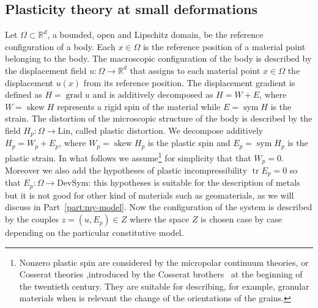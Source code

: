 \documentclass[a4paper,10pt,oneside]{amsbook}
\numberwithin{section}{chapter}
\numberwithin{equation}{chapter}
\theoremstyle{definition}
\DeclareMathOperator{\tr}{tr}
\DeclareMathOperator{\sym}{sym}
\DeclareMathOperator{\ske}{skew}
\DeclareMathOperator{\grad}{grad}
\begin{document}
\subsection{Plasticity theory at small deformations}

Let $\Omega\subset\mathbb{R}^d$, a bounded, open and Lipschitz domain, be the reference configuration of a body. Each $x\in\Omega$ is the reference position of a material point belonging to the body. The macroscopic configuration of the body is described by the displacement field $u\colon\Omega\to\mathbb{R}^d$ that assigns to each material point $x\in\Omega$ the displacement $u(x)$ from its reference position. The displacement gradient is defined as $H=\grad u$ and is additively decomposed as $H=W+E$, where $W=\ske H$ represents a rigid spin of the material while $E=\sym H$ is the strain. The distortion of the microscopic structure of the body is described by the field $H_p\colon\Omega\to\text{Lin}$, called plastic distortion. We decompose additively $H_p=W_p+E_p$, where $W_p=\ske H_p$ is the plastic spin and $E_p=\sym H_p$ is the plastic strain. In what follows we assume\footnote{Nonzero plastic spin are considered by the micropolar continuum theories, or Cosserat theories ,introduced by the Cosserat brothers~\cite{cosserat1909} at the beginning of the twentieth century. They are suitable for describing, for example, granular materials when is relevant the change of the orientations of the grains.} for simplicity that that $W_p=0$. Moreover we also add the hypotheses of plastic incompressibility $\tr E_p=0$ so that $E_p\colon\Omega\to\text{DevSym}$: this hypotheses is suitable for the description of metals but it is not good for other kind of materials such as geomaterials, as we will discuss in Part~\ref{part:my-model}. Now the configuration of the system is described by the couples $z=(u,E_p)\in Z$ where the space $Z$ is chosen case by case depending on the particular constitutive model.
\end{document}
